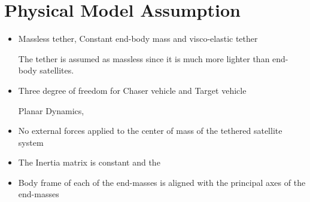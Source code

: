\section{Physical Model Assumption}

\begin{itemize}

\item Massless tether, Constant end-body mass and visco-elastic tether

The tether is assumed as massless since it is much more lighter than end-body satellites.  

\item Three degree of freedom for Chaser vehicle and Target vehicle

Planar Dynamics, 
\item No external forces applied to the center of mass of the tethered satellite system

\item The Inertia matrix is constant and the 

\item Body frame of each of the end-masses is aligned with the principal axes of the end-masses


\end{itemize}

\section{}

\section{}

\section{}
